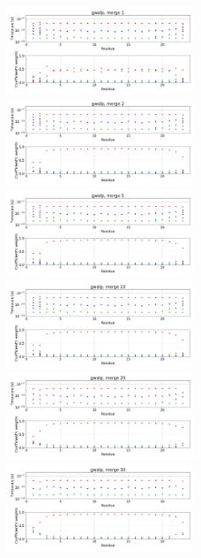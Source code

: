 \documentclass[12pt]{article}
\begin{document}
\begin{figure}
\centering
\includegraphics[width=0.5\textwidth]{gwalp_1.png}
\includegraphics[width=0.5\textwidth]{gwalp_2.png}
\includegraphics[width=0.5\textwidth]{gwalp_5.png}
\includegraphics[width=0.5\textwidth]{gwalp_10.png}
\includegraphics[width=0.5\textwidth]{gwalp_20.png}
\includegraphics[width=0.5\textwidth]{gwalp_30.png}
\end{figure}
\end{document}
